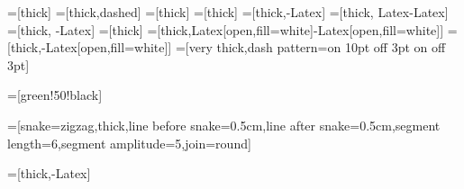 

\usetikzlibrary{arrows.meta}
\usetikzlibrary{bending}
\usetikzlibrary{positioning}
\usetikzlibrary{snakes}
\usetikzlibrary{shapes.misc}
\usetikzlibrary{shapes.geometric}

=[thick]
=[thick,dashed]
=[thick]
=[thick]
=[thick,-{Latex}]
=[thick, {Latex}-{Latex}]
=[thick, -{Latex}]
=[thick]
=[thick,{Latex[open,fill=white]}-{Latex[open,fill=white]}]
=[thick,-{Latex[open,fill=white]}]
=[very thick,dash pattern=on 10pt off 3pt on \the\pgflinewidth off 3pt]

=[green!50!black]

=[snake=zigzag,thick,line before snake=0.5cm,line after snake=0.5cm,segment length=6,segment amplitude=5,join=round]

=[thick,-{Latex}]



